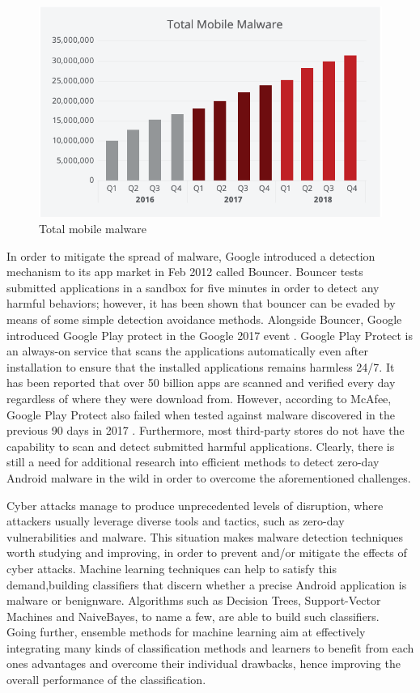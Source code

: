 \begin{figure}[htbp]
    \centering
    \includegraphics[scale=0.9]{./Figure/androidgraph.png}
    \caption{Total mobile malware \cite{mcafee}}
    \label{fig:androidgraph}
  \end{figure}

In order to mitigate the spread of malware, Google introduced a detection mechanism to its app market in Feb 2012 called Bouncer. Bouncer tests submitted applications in a sandbox for five minutes in order to detect any harmful behaviors; however, it has been shown that bouncer can be evaded by means of some simple detection avoidance methods. Alongside Bouncer, Google introduced Google Play protect in the Google 2017 event \cite{googleplay}. Google Play Protect is an always-on service that scans the applications automatically even after installation to ensure that the installed applications remains harmless 24/7. It has been reported that over 50 billion apps are scanned and verified every day regardless of where they were download from. However, according to McAfee, Google Play Protect also failed when tested against malware discovered in the previous 90 days in 2017 \cite{mcafee2018}. Furthermore, most third-party stores do not have the capability to scan and detect submitted harmful applications. Clearly, there is still a need for additional research into efficient methods to detect zero-day Android malware in the wild in order to overcome the aforementioned challenges.

Cyber attacks manage to produce unprecedented levels of disruption, where attackers usually leverage diverse tools and tactics, such as zero-day vulnerabilities and malware. This situation makes malware detection techniques worth studying and improving, in order to prevent and/or mitigate the effects of cyber attacks. Machine learning techniques can help to satisfy this demand,building classifiers that discern whether a precise Android application is malware or benignware. Algorithms such as Decision Trees, Support-Vector Machines and NaiveBayes, to name a few, are able to build such classifiers.　Going further, ensemble methods for machine learning aim at effectively integrating many kinds of classification methods and learners to benefit from each ones advantages and overcome their individual drawbacks, hence improving the overall performance of the classiﬁcation.

